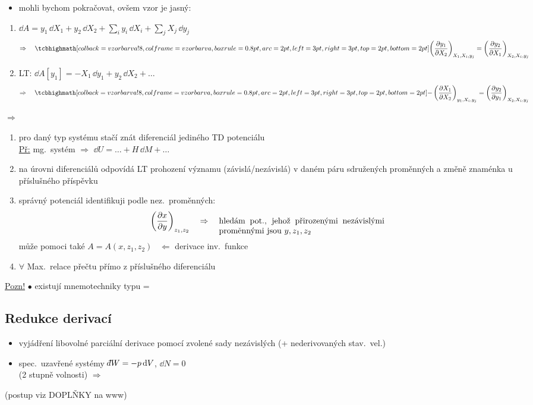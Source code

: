 \begin{itemize}
  \item mohli bychom pokračovat, ovšem vzor je jasný:
\end{itemize}
\begin{veta}
\begin{enumerate}[label=\arabic*)]
  \item $\dd A = y_1\,\dd X_1 + y_2\,\dd X_2 + \sum_i y_i\,\dd X_i + \sum_j X_j\,\dd y_j$
  \[
    \Rightarrow\quad \vzorec{\left(\pdv{y_1}{X_2}\right)_{X_1,X_i,y_j} = \left(\pdv{y_2}{X_1}\right)_{X_2,X_i,y_j}}
  \]
  \item LT: \quad $\dd A[y_1] = -X_1\,\dd y_1 + y_2\,\dd X_2 + \dots$
  \[
    \Rightarrow\quad \vzorec{-\left(\pdv{X_1}{X_2}\right)_{y_1,X_i,y_j} = \left(\pdv{y_2}{y_1}\right)_{X_2,X_i,y_j}}
  \]
\end{enumerate}
\end{veta}

$\Rightarrow$
\begin{enumerate}[label=\arabic*)]
  \item pro daný typ systému stačí znát diferenciál jediného TD potenciálu \\
        \underline{Př:} mg.\ systém $\Rightarrow$ $\dd U = \dots + H\,\dd M + \dots$
  \item na úrovni diferenciálů odpovídá LT prohození významu (závislá/nezávislá) v daném páru sdružených proměnných a změně znaménka u příslušného příspěvku
  \item správný potenciál identifikuji podle nez.\ proměnných:
  \[
    \left(\pdv{x}{y}\right)_{z_1,z_2} \quad\Rightarrow\quad
    \text{\parbox[t]{7cm}{hledám pot., jehož přirozenými nezávislými proměnnými jsou $y, z_1, z_2$}}
  \]
  \pozor{!} může pomoci také $A = A(x,z_1,z_2)$ \ $\Leftarrow$ derivace inv.\ funkce
  \item $\forall$ Max.\ relace přečtu přímo z příslušného diferenciálu
\end{enumerate}

\underline{Pozn!} $\bullet$ existují mnemotechniky typu  =  \\
\quad {}

\subsection{Redukce derivací}
\begin{itemize}[nosep]
  \item[--] vyjádření libovolné parciální derivace pomocí zvolené sady nezávislých (+ nederivovaných stav.\ vel.)
  \item[--] spec.\ uzavřené systémy $\dbar W = -p\,\dd V$, $\dd N = 0$ \\
            (2 stupně volnosti) \quad $\Rightarrow$ \quad {}
\end{itemize}
\hspace*{3cm}(postup viz DOPLŇKY na www)

